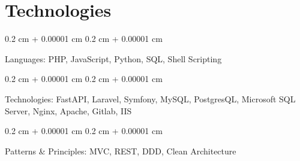 \documentclass[10pt, letterpaper]{article}
\newenvironment{onecolentry}{
    \begin{adjustwidth}{
        0.2 cm + 0.00001 cm
    }{
        0.2 cm + 0.00001 cm
    }
}{
    \end{adjustwidth}
} %
\begin{document}
        

    \section{Technologies}


        
        \begin{onecolentry}
                Languages: PHP, JavaScript, Python, SQL, Shell Scripting
        \end{onecolentry}
            
                \vspace{0.2 cm}
            
        
        \begin{onecolentry}
                Technologies: FastAPI, Laravel, Symfony, MySQL, PostgresQL, Microsoft SQL Server, Nginx, Apache, Gitlab, IIS
        \end{onecolentry}
            
                \vspace{0.2 cm}
            
        
        \begin{onecolentry}
                Patterns \& Principles: MVC, REST, DDD, Clean Architecture
        \end{onecolentry}
            
        
\end{document}
